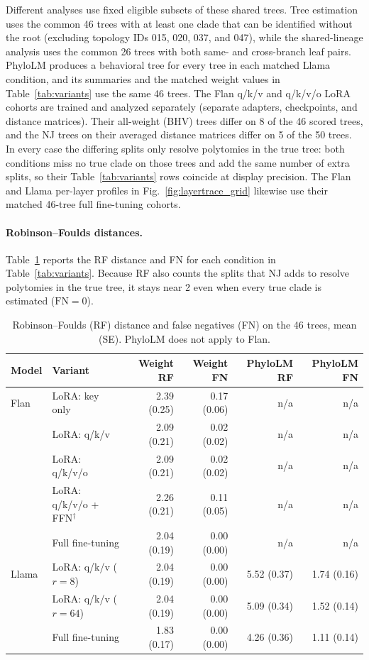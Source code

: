 \documentclass{article}
\theoremstyle{definition}
\theoremstyle{plain}
\begin{document}
Different analyses use fixed eligible subsets of these shared trees. Tree estimation uses the
common 46 trees with at least one clade that can be identified without the root (excluding topology IDs 015, 020,
037, and 047), while the shared-lineage analysis uses the common 26 trees with both same- and cross-branch leaf pairs. PhyloLM produces a behavioral tree for every tree in each matched Llama
condition, and its summaries and the matched weight values in
Table~\ref{tab:variants} use the same 46 trees. The Flan q/k/v and q/k/v/o LoRA cohorts are
trained and analyzed separately (separate adapters, checkpoints, and distance matrices). Their
all-weight (BHV) trees differ on 8 of the 46 scored trees, and the NJ trees on their averaged distance
matrices differ on 5 of the 50 trees. In every case the differing splits only resolve polytomies in the true
tree: both conditions miss no true clade on those trees and add the same number of extra splits, so their
Table~\ref{tab:variants} rows coincide at display precision. The Flan and Llama per-layer profiles
in Fig.~\ref{fig:layertrace_grid} likewise use their matched 46-tree full fine-tuning cohorts.

\paragraph{Robinson--Foulds distances.}\label{app:rf}
Table~\ref{tab:rf} reports the RF distance and FN for each condition in Table~\ref{tab:variants}. Because RF also counts the splits that NJ adds to resolve polytomies in the true tree, it stays near 2 even when every true clade is estimated ($\mathrm{FN}=0$).

\begin{table}[h]
\caption{Robinson--Foulds (RF) distance and false negatives (FN) on the 46 trees, mean (SE). PhyloLM does not apply to Flan.}
\label{tab:rf}
\centering
\scriptsize
\begin{tabular}{llrrrr}
\toprule
Model & Variant & Weight RF & Weight FN & PhyloLM RF & PhyloLM FN \\
\midrule
Flan & LoRA: key only                   & 2.39 (0.25) & 0.17 (0.06) & n/a & n/a \\
     & LoRA: q/k/v                      & 2.09 (0.21) & 0.02 (0.02) & n/a & n/a \\
     & LoRA: q/k/v/o                    & 2.09 (0.21) & 0.02 (0.02) & n/a & n/a \\
     & LoRA: q/k/v/o + FFN$^\dagger$    & 2.26 (0.21) & 0.11 (0.05) & n/a & n/a \\
     & Full fine-tuning                 & 2.04 (0.19) & 0.00 (0.00) & n/a & n/a \\
\midrule
Llama & LoRA: q/k/v ($r{=}8$)          & 2.04 (0.19) & 0.00 (0.00) & 5.52 (0.37) & 1.74 (0.16) \\
      & LoRA: q/k/v ($r{=}64$)         & 2.04 (0.19) & 0.00 (0.00) & 5.09 (0.34) & 1.52 (0.14) \\
      & Full fine-tuning                & 1.83 (0.17) & 0.00 (0.00) & 4.26 (0.36) & 1.11 (0.14) \\
\bottomrule
\end{tabular}
\end{table}
\end{document}
